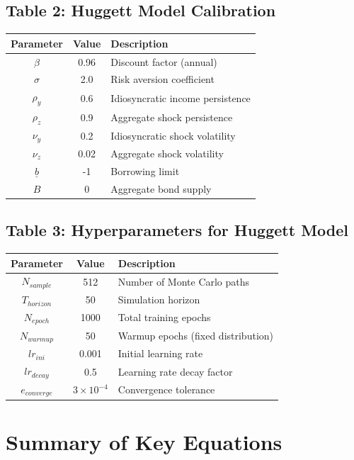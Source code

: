 \documentclass[12pt,a4paper]{article}
\begin{document}
\subsection{Table 2: Huggett Model Calibration}
\begin{tabular}{|c|c|p{6cm}|}
\hline
Parameter & Value & Description \\
\hline
$\beta$ & 0.96 & Discount factor (annual) \\
\hline
$\sigma$ & 2.0 & Risk aversion coefficient \\
\hline
$\rho_y$ & 0.6 & Idiosyncratic income persistence \\
\hline
$\rho_z$ & 0.9 & Aggregate shock persistence \\
\hline
$\nu_y$ & 0.2 & Idiosyncratic shock volatility \\
\hline
$\nu_z$ & 0.02 & Aggregate shock volatility \\
\hline
$\underline{b}$ & -1 & Borrowing limit \\
\hline
$B$ & 0 & Aggregate bond supply \\
\hline
\end{tabular}

\subsection{Table 3: Hyperparameters for Huggett Model}
\begin{tabular}{|c|c|p{6cm}|}
\hline
Parameter & Value & Description \\
\hline
$N_{sample}$ & 512 & Number of Monte Carlo paths \\
\hline
$T_{horizon}$ & 50 & Simulation horizon \\
\hline
$N_{epoch}$ & 1000 & Total training epochs \\
\hline
$N_{warmup}$ & 50 & Warmup epochs (fixed distribution) \\
\hline
$lr_{ini}$ & 0.001 & Initial learning rate \\
\hline
$lr_{decay}$ & 0.5 & Learning rate decay factor \\
\hline
$e_{converge}$ & $3\times10^{-4}$ & Convergence tolerance \\
\hline
\end{tabular}

\section{Summary of Key Equations}
\end{document}
